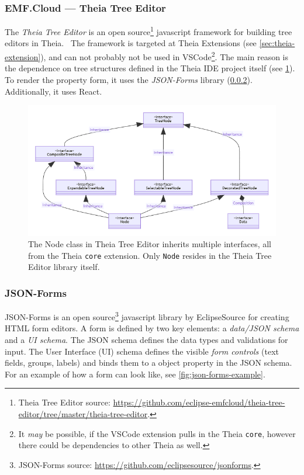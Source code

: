 \subsubsection{EMF.Cloud --- Theia Tree Editor}\label{sec:theia-tree-editor}
The \emph{Theia Tree Editor} is an \gls{open source}\footnote{Theia Tree Editor source: \href{https://github.com/eclipse-emfcloud/theia-tree-editor/tree/master/theia-tree-editor}{https://github.com/eclipse-emfcloud/theia-tree-editor/tree/master/theia-tree-editor}.} javascript framework for building tree editors in \gls{Theia}.~\cite{EclipseemfcloudTheiatreeeditor2020}
The framework is targeted at Theia Extensions (see \cref{sec:theia-extension}), and can not probably not be used in \gls{VSCode}\footnote{It \textit{may} be possible, if the VSCode extension pulls in the Theia \texttt{core}, however there could be dependencies to other \gls{Theia}  as well.}.
The main reason is the dependence on tree structures defined in the Theia \acrshort{IDE} project itself (see \cref{fig:theia-tree-editor-node}).
To render the property form, it uses the \emph{JSON-Forms} library (\cref{sec:json-forms}).
Additionally, it uses \gls{React}.

\begin{figure}[htbp]  %
  \centering
  \includegraphics[width=\textwidth]{figures/theia-tree-editor-node.png}
  \caption[Theia Tree Editor Node's Class Hierarchy]{The Node class in Theia Tree Editor inherits multiple interfaces, all from the Theia \texttt{core} extension. Only \texttt{Node} resides in the Theia Tree Editor library itself.}\label{fig:theia-tree-editor-node}
\end{figure}

\subsubsection{JSON-Forms}\label{sec:json-forms}
JSON-Forms is an \gls{open source}\footnote{JSON-Forms source: \href{https://github.com/eclipsesource/jsonforms}{https://github.com/eclipsesource/jsonforms}.} javascript library by EclipseSource for creating HTML form editors.
A form is defined by two key elements: a \emph{data/JSON schema} and a \emph{UI schema}.
The \gls{JSON} schema defines the data types and validations for input.
The User Interface (UI) schema defines the visible \emph{form controls} (text fields, groups, labels) and binds them to a object property in the JSON schema.~\cite{eclipsesourceJSONForms}
For an example of how a form can look like, see \cref{fig:json-forms-example}.

